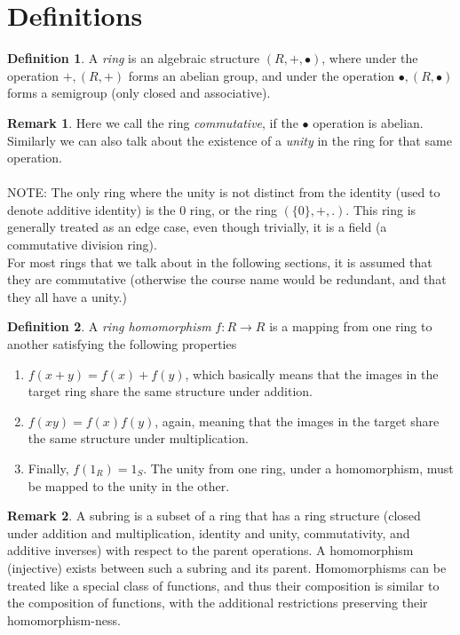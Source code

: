 \documentclass[12pt]{book}
\theoremstyle{definition}
\newtheorem*{definition}{Definition}
\newtheorem*{remark}{Remark}
\begin{document}
\section{Definitions}
\begin{definition}
    A \textit{ring} is an algebraic structure $(R, +, \bullet)$, where under the operation $+, (R, +)$ forms an abelian group, and under the operation $\bullet, (R, \bullet)$ forms a semigroup (only closed and associative). 
\end{definition}
\begin{remark}
    Here we call the ring \textit{commutative}, if the $\bullet$ operation is abelian. Similarly we can also talk about the existence of a \textit{unity} in the ring for that same operation. \\\\
    NOTE: The only ring where the unity is not distinct from the identity (used to denote additive identity) is the $0$ ring, or the ring $(\{0\}, + , .)$. This ring is generally treated as an edge case, even though trivially, it is a field (a commutative division ring).\\
    
    For most rings that we talk about in the following sections, it is assumed that they are commutative (otherwise the course name would be redundant, and that they all have a unity.)
\end{remark}
\begin{definition}
    A \textit{ring homomorphism} $f: R \to R$ is a mapping from one ring to another satisfying the following properties \begin{enumerate}
        \item $f(x + y) = f(x) + f(y)$, which basically means that the images in the target ring share the same structure under addition.
        \item $f(xy) = f(x)f(y)$, again, meaning that the images in the target share the same structure under multiplication.
        \item Finally, $f(1_R) = 1_S$. The unity from one ring, under a homomorphism, must be mapped to the unity in the other.
    \end{enumerate}
\end{definition}
\begin{remark}
    A subring is a subset of a ring that has a ring structure (closed under addition and multiplication, identity and unity, commutativity, and additive inverses) with respect to the parent operations. A homomorphism (injective) exists between such a subring and its parent. Homomorphisms can be treated like a special class of functions, and thus their composition is similar to the composition of functions, with the additional restrictions preserving their homomorphism-ness.
\end{remark}
\end{document}
